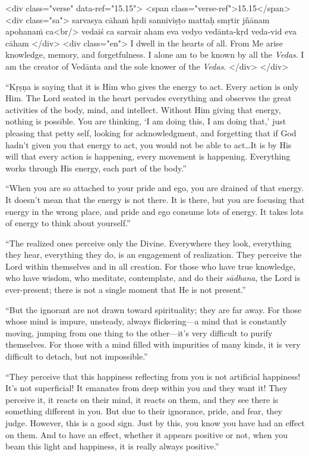 \begin{html}
<div class="verse" data-ref="15.15">
  <span class="verse-ref">15.15</span>
  <div class="sa">
    sarvasya cāhaṁ hṛdi sanniviṣṭo mattaḥ smṛtir jñānam apohanaṁ ca<br/>
    vedaiś ca sarvair aham eva vedyo vedānta-kṛd veda-vid eva cāham
  </div>
  <div class="en">
    I dwell in the hearts of all. From Me arise knowledge, memory, and forgetfulness. I alone am to be known by all the \textit{Vedas}. I am the creator of Vedānta and the sole knower of the \textit{Vedas}.
  </div>
</div>
\end{html}


\enquote{Kṛṣṇa is saying that it is Him who gives the energy to act. Every action is only Him. The Lord seated in the heart pervades everything and observes the great activities of the body, mind, and intellect. Without Him giving that energy, nothing is possible. You are thinking, \enquote{I am doing this, I am doing that,} just pleasing that petty self, looking for acknowledgment, and forgetting that if God hadn’t given you that energy to act, you would not be able to act\ldots It is by His will that every action is happening, every movement is happening. Everything works through His energy, each part of the body.}

\enquote{When you are so attached to your pride and ego, you are drained of that energy. It doesn’t mean that the energy is not there. It is there, but you are focusing that energy in the wrong place, and pride and ego consume lots of energy. It takes lots of energy to think about yourself.}

\enquote{The realized ones perceive only the Divine. Everywhere they look, everything they hear, everything they do, is an engagement of realization. They perceive the Lord within themselves and in all creation. For those who have true knowledge, who have wisdom, who meditate, contemplate, and do their \textit{sādhana}, the Lord is ever-present; there is not a single moment that He is not present.}

\enquote{But the ignorant are not drawn toward spirituality; they are far away. For those whose mind is impure, unsteady, always flickering---a mind that is constantly moving, jumping from one thing to the other---it’s very difficult to purify themselves. For those with a mind filled with impurities of many kinds, it is very difficult to detach, but not impossible.}

\enquote{They perceive that this happiness reflecting from you is not artificial happiness! It’s not superficial! It emanates from deep within you and they want it! They perceive it, it reacts on their mind, it reacts on them, and they see there is something different in you. But due to their ignorance, pride, and fear, they judge. However, this is a good sign. Just by this, you know you have had an effect on them. And to have an effect, whether it appears positive or not, when you beam this light and happiness, it is really always positive.}

